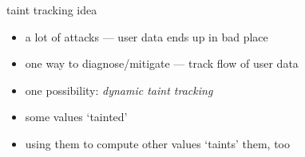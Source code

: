 
\begin{frame}{taint tracking idea}
    \begin{itemize}
        \item a lot of attacks --- user data ends up in bad place
        \vspace{.5cm}
        \item one way to diagnose/mitigate --- track flow of user data
        \item one possibility: \textit{dynamic taint tracking}
        \item some values `tainted'
        \item using them to compute other values `taints' them, too
    \end{itemize}
\end{frame}


